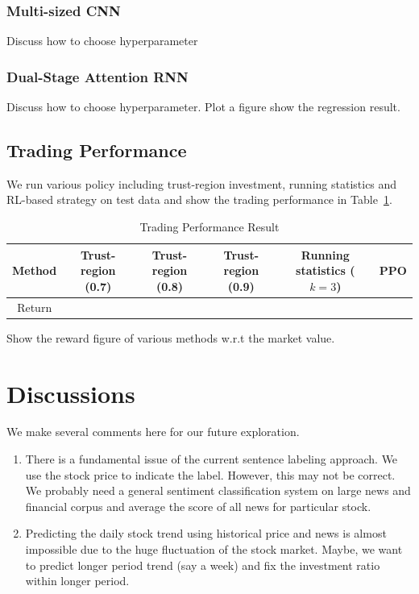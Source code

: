 \documentclass[11pt,a4paper]{article}
\begin{document}
\subsubsection{Multi-sized CNN}
Discuss how to choose hyperparameter

\subsubsection{Dual-Stage Attention RNN}
Discuss how to choose hyperparameter. Plot a figure show the regression result.

\subsection{Trading Performance}
We run various policy including trust-region investment, running statistics and RL-based strategy on test data and show the trading performance in Table~\ref{table:trading_performance}.
\begin{table}
  \centering
  \caption{Trading Performance Result}
  \begin{tabular}{|c|c|c|c|c|c|}
    \hline
    Method & Trust-region (0.7) & Trust-region (0.8) & Trust-region (0.9) & Running statistics ($k=3$) & PPO \\\hline
    Return &   &  & & & \\\hline
  \end{tabular}
  \label{table:trading_performance}
\end{table}
Show the reward figure of various methods w.r.t the market value.

\section{Discussions}
We make several comments here for our future exploration.
\begin{enumerate}
  \item There is a fundamental issue of the current sentence labeling approach. We use the stock price to indicate the label. However, this may not be correct. We probably need a general sentiment classification system on large news and financial corpus and average the score of all news for particular stock.
  \item Predicting the daily stock trend using historical price and news is almost impossible due to the huge fluctuation of the stock market. Maybe, we want to predict longer period trend (say a week) and fix the investment ratio within longer period.
\end{enumerate}





%
\end{document}
